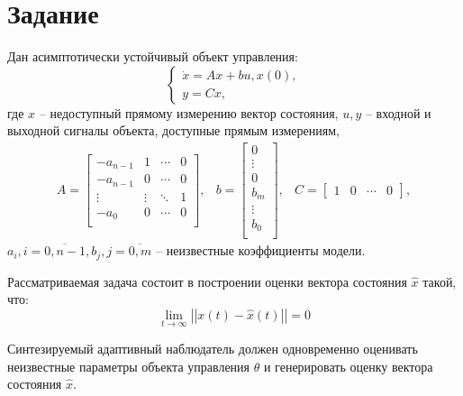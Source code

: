 \documentclass[14pt, a4paper]{extarticle}
\begin{document}
	\onehalfspacing
	
	\setcounter{page}{2}
	
	\section*{Задание}
	
	Дан асимптотически устойчивый объект управления:
	$$\begin{cases}
		\dot{x} = Ax + bu, x(0),\\
		y = Cx,
	\end{cases}$$
	где $x$ -- недоступный прямому измерению вектор состояния, $u, y$ -- входной и выходной сигналы объекта, доступные прямым измерениям,
	$$\begin{matrix}
		A=\left[\begin{matrix}
			-a_{n-1} & 1 & \cdots & 0 \\
			-a_{n-1} & 0 & \cdots & 0 \\
			\vdots & \vdots & \ddots & 1 \\
			-a_0 & 0 & \cdots & 0 \\
		\end{matrix}\right], & b=\left[\begin{matrix}
			0 \\ \vdots \\ 0 \\ b_m \\ \vdots \\ b_0 \\
		\end{matrix}\right], & C=\left[\begin{matrix}
			1 & 0 & \cdots & 0
		\end{matrix}\right],
	\end{matrix}$$
	$a_i,i=\overline{0,n-1},b_j,j=\overline{0,m}$ -- неизвестные коэффициенты модели.
	
	Рассматриваемая задача состоит в построении оценки вектора состояния $\hat{x}$ такой, что:
	$$\lim\limits_{t\to\infty}\left|\left|x(t)-\hat{x}(t)\right|\right|=0$$
	
	Синтезируемый адаптивный наблюдатель должен одновременно оценивать неизвестные параметры объекта управления $\theta$ и генерировать оценку вектора состояния $\hat{x}$.
\end{document}
